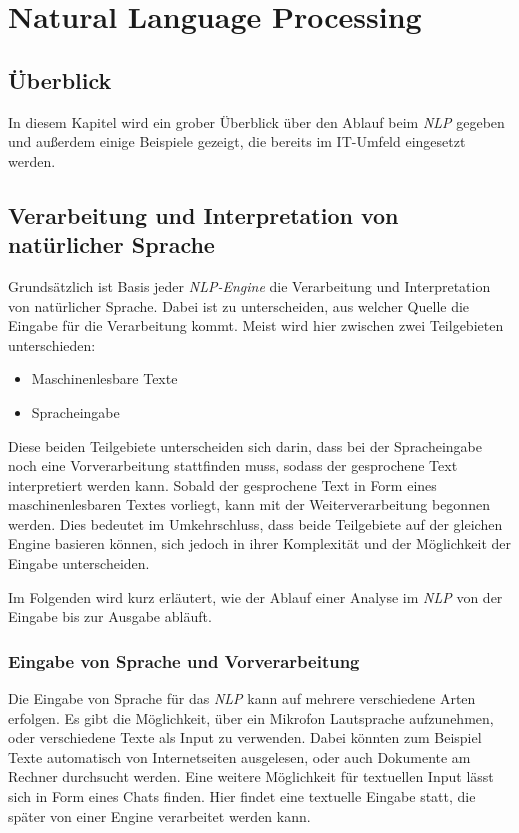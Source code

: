 \chapter{Natural Language Processing}
\label{cha:NaturalLanguageProcessing}
\section{Überblick}
In diesem Kapitel wird ein grober Überblick über den Ablauf beim \textit{NLP} gegeben und außerdem einige Beispiele gezeigt, die bereits im IT-Umfeld eingesetzt werden. 

\section{Verarbeitung und Interpretation von natürlicher Sprache}
\label{sec:applications-natural-language-processing}
Grundsätzlich ist Basis jeder \textit{NLP-Engine} die Verarbeitung und Interpretation von natürlicher Sprache. Dabei ist zu unterscheiden, aus welcher Quelle die Eingabe für die Verarbeitung kommt. Meist wird hier zwischen zwei Teilgebieten unterschieden:

\begin{itemize}
	\item Maschinenlesbare Texte
	\item Spracheingabe
\end{itemize}

Diese beiden Teilgebiete unterscheiden sich darin, dass bei der Spracheingabe noch eine Vorverarbeitung stattfinden muss, sodass der gesprochene Text interpretiert werden kann. Sobald der gesprochene Text in Form eines maschinenlesbaren Textes vorliegt, kann mit der Weiterverarbeitung begonnen werden. Dies bedeutet im Umkehrschluss, dass beide Teilgebiete auf der gleichen Engine basieren können, sich jedoch in ihrer Komplexität und der Möglichkeit der Eingabe unterscheiden. 

Im Folgenden wird kurz erläutert, wie der Ablauf einer Analyse im \textit{NLP} von der Eingabe bis zur Ausgabe abläuft. 

\subsection{Eingabe von Sprache und Vorverarbeitung}
Die Eingabe von Sprache für das \textit{NLP} kann auf mehrere verschiedene Arten erfolgen. Es gibt die Möglichkeit, über ein Mikrofon Lautsprache aufzunehmen, oder verschiedene Texte als Input zu verwenden. Dabei könnten zum Beispiel Texte automatisch von Internetseiten ausgelesen, oder auch Dokumente am Rechner durchsucht werden. Eine weitere Möglichkeit für textuellen Input lässt sich in Form eines Chats finden. Hier findet eine textuelle Eingabe statt, die später von einer Engine verarbeitet werden kann. 

